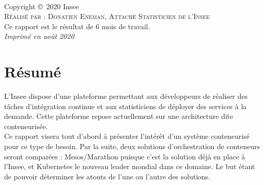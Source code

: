 \documentclass[11pt,fleqn]{book} %
\begin{document}




\newpage
~\vfill
\thispagestyle{empty}

\noindent Copyright \copyright\ 2020 Insee\\ %

\noindent \textsc{Réalisé par : Donatien Eneman, Attaché Statisticien de l'Insee}\\ %

\noindent Ce rapport est le résultat de 6 mois de travail. \\ %

\noindent \textit{Imprimé en août 2020} %

\frontmatter

\chapter*{Résumé}
\vspace{-2cm}
L'Insee dispose d'une plateforme permettant aux développeurs de réaliser des tâches d'intégration continue et aux statisticiens de déployer des services à la demande. Cette plateforme repose actuellement sur une architecture dite conteneurisée.\\

Ce rapport visera tout d'abord à présenter l'intérêt d'un système conteneurisé pour ce type de besoin. Par la suite, deux solutions d'orchestration de conteneurs seront comparées : Mesos/Marathon puisque c'est la solution déjà en place à l'Insee, et Kubernetes le nouveau leader mondial dans ce domaine. Le but étant de pouvoir déterminer les atouts de l'une ou l'autre des solutions.\\
\end{document}
